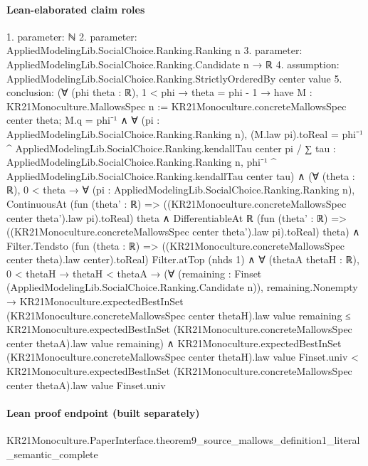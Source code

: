 \documentclass[10pt]{article}
\begin{document}
\paragraph{Lean-elaborated claim roles}\begin{ReviewVerbatim}
1. parameter: ℕ
2. parameter: AppliedModelingLib.SocialChoice.Ranking.Ranking n
3. parameter: AppliedModelingLib.SocialChoice.Ranking.Candidate n → ℝ
4. assumption: AppliedModelingLib.SocialChoice.Ranking.StrictlyOrderedBy center value
5. conclusion: (∀ (phi theta : ℝ),
    1 < phi →
      theta = phi - 1 →
        have M : KR21Monoculture.MallowsSpec n := KR21Monoculture.concreteMallowsSpec center theta;
        M.q = phi⁻¹ ∧
          ∀ (pi : AppliedModelingLib.SocialChoice.Ranking.Ranking n),
            (M.law pi).toReal =
              phi⁻¹ ^ AppliedModelingLib.SocialChoice.Ranking.kendallTau center pi /
                ∑ tau : AppliedModelingLib.SocialChoice.Ranking.Ranking n,
                  phi⁻¹ ^ AppliedModelingLib.SocialChoice.Ranking.kendallTau center tau) ∧
  (∀ (theta : ℝ),
      0 < theta →
        ∀ (pi : AppliedModelingLib.SocialChoice.Ranking.Ranking n),
          ContinuousAt (fun (theta' : ℝ) => ((KR21Monoculture.concreteMallowsSpec center theta').law pi).toReal) theta ∧
            DifferentiableAt ℝ (fun (theta' : ℝ) => ((KR21Monoculture.concreteMallowsSpec center theta').law pi).toReal)
              theta) ∧
    Filter.Tendsto (fun (theta : ℝ) => ((KR21Monoculture.concreteMallowsSpec center theta).law center).toReal)
        Filter.atTop (nhds 1) ∧
      ∀ (thetaA thetaH : ℝ),
        0 < thetaH →
          thetaH < thetaA →
            (∀ (remaining : Finset (AppliedModelingLib.SocialChoice.Ranking.Candidate n)),
                remaining.Nonempty →
                  KR21Monoculture.expectedBestInSet (KR21Monoculture.concreteMallowsSpec center thetaH).law value
                      remaining ≤
                    KR21Monoculture.expectedBestInSet (KR21Monoculture.concreteMallowsSpec center thetaA).law value
                      remaining) ∧
              KR21Monoculture.expectedBestInSet (KR21Monoculture.concreteMallowsSpec center thetaH).law value
                  Finset.univ <
                KR21Monoculture.expectedBestInSet (KR21Monoculture.concreteMallowsSpec center thetaA).law value
                  Finset.univ
\end{ReviewVerbatim}

\paragraph{Lean proof endpoint (built separately)}\begin{ReviewVerbatim}
KR21Monoculture.PaperInterface.theorem9_source_mallows_definition1_literal_semantic_complete
\end{ReviewVerbatim}
\end{document}
